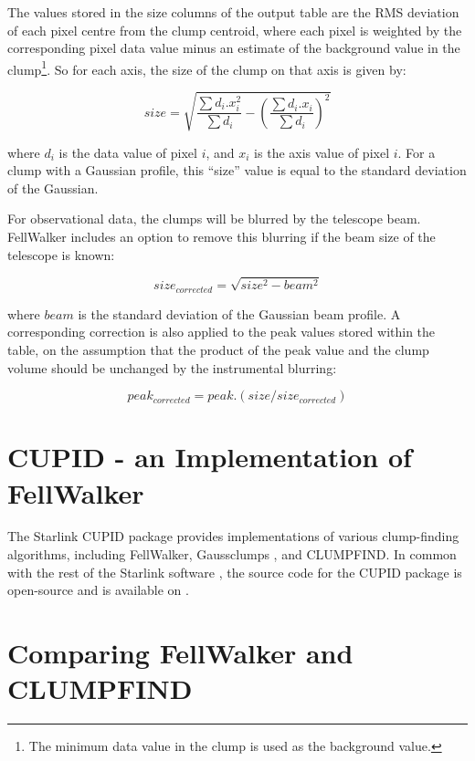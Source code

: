 \documentclass[final,authoryear,5p,times,twocolumn]{elsarticle}
\begin{document}
The values stored in the size columns of the output table are the RMS
deviation of each pixel centre from the clump centroid, where each pixel
is weighted by the corresponding pixel data value minus an estimate of
the background value in the clump\footnote{The minimum data value in the
clump is used as the background value.}. So for each axis, the size of
the clump on that axis is given by:

\[ size = \sqrt{ \frac{ \sum d_{i}.x_{i}^{2} }{ \sum d_{i} } -
\left( \frac{\sum d_{i}.x_{i} }{\sum d_{i}}  \right)^2 } \]

where $d_{i}$ is the data value of pixel $i$, and $x_{i}$ is the axis
value of pixel $i$. For a clump with a Gaussian profile, this
``size'' value is equal to the standard deviation of the Gaussian.

For observational data, the clumps will be blurred by the telescope beam.
FellWalker includes an option to remove this blurring if the beam size of
the telescope is known:

\[ size_{corrected} = \sqrt{ size^{2} - beam^{2} } \]

where $beam$ is the standard deviation of the Gaussian beam profile. A
corresponding correction is also applied to the peak values stored within
the table, on the assumption that the product of the peak value and the
clump volume should be unchanged by the instrumental blurring:

\[ peak_{corrected} = peak.(size/size_{corrected}) \]




\section{\label{sec:cupid}CUPID - an Implementation of FellWalker}
The Starlink CUPID package \citep[][]{CupidAdass,SUN255} provides
implementations of various clump-finding algorithms, including FellWalker,
Gaussclumps \citep[][]{1990ApJ...356..513S},
and CLUMPFIND. In common with the rest of the Starlink software \citep[][]{StarlinkAdass},
the source code for the CUPID package is open-source and is available on
.

\section{Comparing FellWalker and CLUMPFIND}
\end{document}
